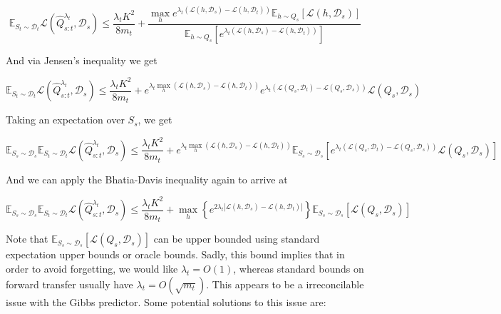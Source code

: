 \documentclass[letterpaper]{article}
\theoremstyle{definition}
\begin{document}
$$\mathbb{E}_{S_t\sim \mathcal{D}_t}\mathcal{L}( \hat{Q}^{\lambda_t}_{s:t},\mathcal{D}_s)\leq \frac{\lambda_t K^2}{8m_t}+\frac{\max_h e^{\lambda_t(\mathcal{L}(h,\mathcal{D}_s)-\mathcal{L}(h,\mathcal{D}_t))}\mathbb{E}_{h\sim Q_s}\left [\mathcal{L}(h,\mathcal{D}_s) \right ]}{\mathbb{E}_{h\sim Q_s}\left [e^{\lambda_t(\mathcal{L}(h,\mathcal{D}_s)-\mathcal{L}(h,\mathcal{D}_t))}\right ]}$$

And via Jensen's inequality we get

$$\mathbb{E}_{S_t\sim \mathcal{D}_t}\mathcal{L}( \hat{Q}^{\lambda_t}_{s:t},\mathcal{D}_s)\leq \frac{\lambda_t K^2}{8m_t}+ e^{\lambda_t\max_h(\mathcal{L}(h,\mathcal{D}_s)-\mathcal{L}(h,\mathcal{D}_t))}e^{\lambda_t(\mathcal{L}(Q_s,\mathcal{D}_t)-\mathcal{L}(Q_s,\mathcal{D}_s))}\mathcal{L}(Q_s,\mathcal{D}_s) $$

Taking an expectation over $S_s$, we get

$$\mathbb{E}_{S_s\sim \mathcal{D}_s}\mathbb{E}_{S_t\sim \mathcal{D}_t}\mathcal{L}( \hat{Q}^{\lambda_t}_{s:t},\mathcal{D}_s)\leq \frac{\lambda_t K^2}{8m_t}+ e^{\lambda_t\max_h(\mathcal{L}(h,\mathcal{D}_s)-\mathcal{L}(h,\mathcal{D}_t))}\mathbb{E}_{S_s\sim \mathcal{D}_s}\left [e^{\lambda_t(\mathcal{L}(Q_s,\mathcal{D}_t)-\mathcal{L}(Q_s,\mathcal{D}_s))}\mathcal{L}(Q_s,\mathcal{D}_s) \right ]$$

And we can apply the Bhatia-Davis inequality again to arrive at

\begin{equation}
\mathbb{E}_{S_s\sim \mathcal{D}_s}\mathbb{E}_{S_t\sim \mathcal{D}_t}\mathcal{L}( \hat{Q}^{\lambda_t}_{s:t},\mathcal{D}_s)\leq \frac{\lambda_t K^2}{8m_t}+\max_h \left \{ e^{2\lambda_t|\mathcal{L}(h,\mathcal{D}_s)-\mathcal{L}(h,\mathcal{D}_t)|}\right \}\mathbb{E}_{S_s\sim \mathcal{D}_s}\left [\mathcal{L}(Q_s,\mathcal{D}_s)\right ]
\end{equation}

Note that $\mathbb{E}_{S_s\sim \mathcal{D}_s}\left [\mathcal{L}(Q_s,\mathcal{D}_s)\right ]$ can be upper bounded using standard expectation upper bounds or oracle bounds.
Sadly, this  bound implies that in order to avoid forgetting, we would like $\lambda_t=O(1)$, whereas standard bounds on forward transfer usually have $\lambda_t=O(\sqrt{m_t})$. This appears to be a irreconcilable issue with the Gibbs predictor. Some potential solutions to this issue are:
\end{document}
